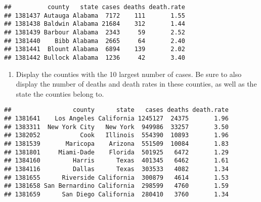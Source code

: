 \documentclass[
]{article}
\newenvironment{Shaded}{\begin{snugshade}}{\end{snugshade}}
\newcommand{\AttributeTok}[1]{\textcolor[rgb]{0.77,0.63,0.00}{#1}}
\newcommand{\ConstantTok}[1]{\textcolor[rgb]{0.00,0.00,0.00}{#1}}
\newcommand{\DecValTok}[1]{\textcolor[rgb]{0.00,0.00,0.81}{#1}}
\newcommand{\FunctionTok}[1]{\textcolor[rgb]{0.00,0.00,0.00}{#1}}
\newcommand{\NormalTok}[1]{#1}
\newcommand{\OtherTok}[1]{\textcolor[rgb]{0.56,0.35,0.01}{#1}}
\newcommand{\SpecialCharTok}[1]{\textcolor[rgb]{0.00,0.00,0.00}{#1}}
\providecommand{\tightlist}{%
  \setlength{\itemsep}{0pt}\setlength{\parskip}{0pt}}
\begin{document}
\begin{Shaded}
\end{Shaded}

\begin{verbatim}
##          county   state cases deaths death.rate
## 1381437 Autauga Alabama  7172    111       1.55
## 1381438 Baldwin Alabama 21684    312       1.44
## 1381439 Barbour Alabama  2343     59       2.52
## 1381440    Bibb Alabama  2665     64       2.40
## 1381441  Blount Alabama  6894    139       2.02
## 1381442 Bullock Alabama  1236     42       3.40
\end{verbatim}

\begin{enumerate}
\def\labelenumi{\alph{enumi}.}
\setcounter{enumi}{2}
\tightlist
\item
  Display the counties with the 10 largest number of cases. Be sure to
  also display the number of deaths and death rates in these counties,
  as well as the state the counties belong to.
\end{enumerate}

\begin{Shaded}
\end{Shaded}

\begin{verbatim}
##                 county      state   cases deaths death.rate
## 1381641    Los Angeles California 1245127  24375       1.96
## 1383311  New York City   New York  949986  33257       3.50
## 1382052           Cook   Illinois  554390  10893       1.96
## 1381539       Maricopa    Arizona  551509  10084       1.83
## 1381801     Miami-Dade    Florida  501925   6472       1.29
## 1384160         Harris      Texas  401345   6462       1.61
## 1384116         Dallas      Texas  303533   4082       1.34
## 1381655      Riverside California  300879   4614       1.53
## 1381658 San Bernardino California  298599   4760       1.59
## 1381659      San Diego California  280410   3760       1.34
\end{verbatim}
\end{document}
